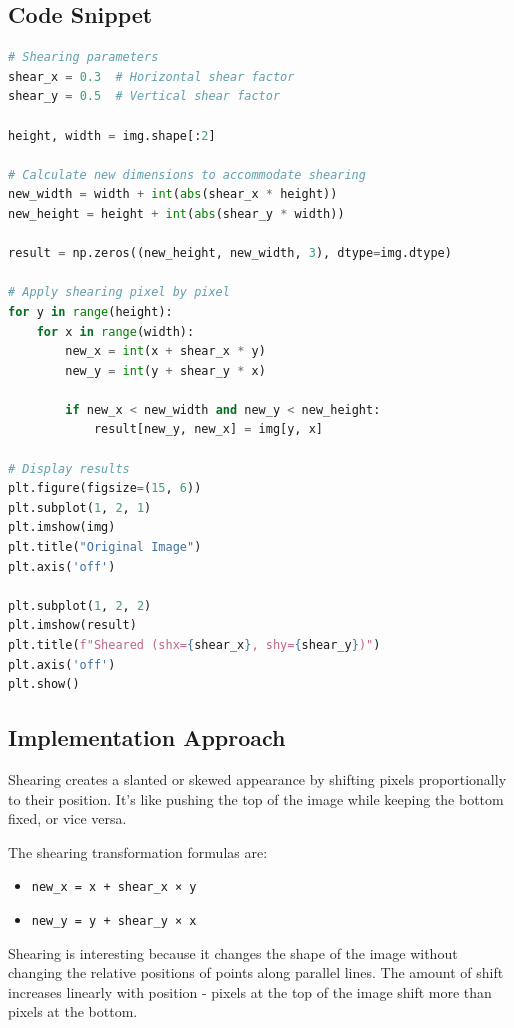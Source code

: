 \documentclass[12pt,a4paper]{report}
\begin{document}
\subsection{Code Snippet}
\begin{lstlisting}[language=Python, caption={Manual Shearing Implementation}]
# Shearing parameters
shear_x = 0.3  # Horizontal shear factor
shear_y = 0.5  # Vertical shear factor

height, width = img.shape[:2]

# Calculate new dimensions to accommodate shearing
new_width = width + int(abs(shear_x * height))
new_height = height + int(abs(shear_y * width))

result = np.zeros((new_height, new_width, 3), dtype=img.dtype)

# Apply shearing pixel by pixel
for y in range(height):
    for x in range(width):
        new_x = int(x + shear_x * y)
        new_y = int(y + shear_y * x)
        
        if new_x < new_width and new_y < new_height:
            result[new_y, new_x] = img[y, x]

# Display results
plt.figure(figsize=(15, 6))
plt.subplot(1, 2, 1)
plt.imshow(img)
plt.title("Original Image")
plt.axis('off')

plt.subplot(1, 2, 2)
plt.imshow(result)
plt.title(f"Sheared (shx={shear_x}, shy={shear_y})")
plt.axis('off')
plt.show()
\end{lstlisting}

\subsection{Implementation Approach}
Shearing creates a slanted or skewed appearance by shifting pixels proportionally to their position. It's like pushing the top of the image while keeping the bottom fixed, or vice versa.

The shearing transformation formulas are:
\begin{itemize}
    \item \texttt{new\_x = x + shear\_x × y}
    \item \texttt{new\_y = y + shear\_y × x}
\end{itemize}

Shearing is interesting because it changes the shape of the image without changing the relative positions of points along parallel lines. The amount of shift increases linearly with position - pixels at the top of the image shift more than pixels at the bottom.
\end{document}
